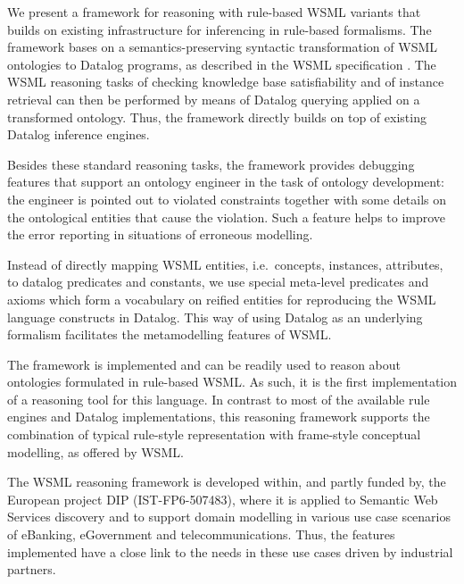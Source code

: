 \smallskip

We present a framework for reasoning with rule-based WSML variants
that builds on existing infrastructure for inferencing in
rule-based formalisms. The framework bases on a
semantics-preserving syntactic transformation of WSML ontologies
to Datalog programs, as described in the WSML specification
\cite{wsml-spec}. The WSML reasoning tasks of checking knowledge
base satisfiability and of instance retrieval can then be
performed by means of Datalog querying applied on a transformed
ontology. Thus, the framework directly builds on top of existing
Datalog inference engines.

Besides these standard reasoning tasks, the framework provides
debugging features that support an ontology engineer in the task
of ontology development: the engineer is pointed out to violated
constraints together with some details on the ontological entities
that cause the violation. Such a feature helps to improve the
error reporting in situations of erroneous modelling.

Instead of directly mapping WSML entities, i.e.\ concepts,
instances, attributes, to datalog predicates and constants, we use
special meta-level predicates and axioms which form a vocabulary
on reified entities for reproducing the WSML language constructs
in Datalog. This way of using Datalog as an underlying formalism
facilitates the metamodelling features of WSML.

\smallskip

The framework is implemented and can be readily used to reason
about ontologies formulated in rule-based WSML. As such, it is the
first implementation of a reasoning tool for this language. In
contrast to most of the available rule engines and Datalog
implementations, this reasoning framework supports the combination
of typical rule-style representation with frame-style conceptual
modelling, as offered by WSML.

The WSML reasoning framework is developed within, and partly
funded by, the European project DIP (IST-FP6-507483), where it is
applied to Semantic Web Services discovery and to support domain
modelling in various use case scenarios of eBanking, eGovernment
and telecommunications. Thus, the features implemented have a
close link to the needs in these use cases driven by industrial
partners.
